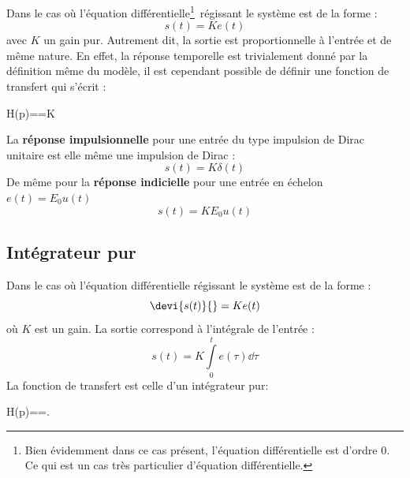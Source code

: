 Dans le cas où l'équation différentielle\footnote{Bien évidemment 
dans ce cas présent, l'équation différentielle est d'ordre 0. Ce qui est 
un cas très particulier d'équation différentielle.}~régissant le système 
est de la forme :
$$
s(t)=Ke(t)
$$
avec $K$ un gain pur. Autrement dit, la sortie est proportionnelle à l'entrée 
et de même nature.
En effet, la réponse temporelle est trivialement donné par la définition 
même du modèle, il est cependant possible de définir une fonction
de transfert qui s'écrit :
\begin{bequation}
H(p)==K
\end{bequation}
La \textbf{réponse impulsionnelle} pour une entrée du type impulsion de 
Dirac unitaire est elle même une impulsion de Dirac :
$$
s(t)=K\delta(t)
$$
De même pour la \textbf{réponse indicielle} pour une entrée en 
échelon $e(t)=E_0u(t)$
$$
s(t)=KE_0u(t)
$$


\subsection{Intégrateur pur}


Dans le cas où l'équation différentielle régissant le système est de la forme :
$$
\devi{s(t)}{}=Ke(t)
$$
où $K$ est un gain. La sortie correspond à l'intégrale de l'entrée :
$$
s(t)=K\int\limits_0^t e(\tau)\dd{\tau}
$$
La fonction de transfert est celle d'un intégrateur pur:
\begin{bequation}
H(p)==.
\end{bequation}

